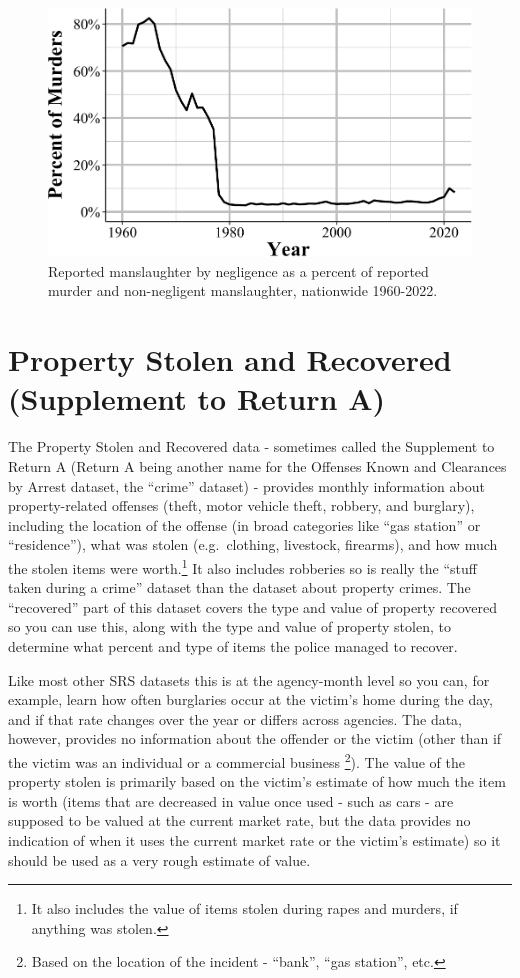 \documentclass[
  12pt,
  openany]{book}
\begin{document}
\begin{figure}

{\centering \includegraphics[width=0.9\linewidth]{03_offenses_known_files/figure-latex/manslaughterPercent-1} 

}

\caption{Reported manslaughter by negligence as a percent of reported murder and non-negligent manslaughter, nationwide 1960-2022.}\label{fig:manslaughterPercent}
\end{figure}

\chapter{Property Stolen and Recovered (Supplement to Return A)}\label{stolen_property}

The Property Stolen and Recovered data - sometimes called the Supplement to Return A (Return A being another name for the Offenses Known and Clearances by Arrest dataset, the ``crime'' dataset) - provides monthly information about property-related offenses (theft, motor vehicle theft, robbery, and burglary), including the location of the offense (in broad categories like ``gas station'' or ``residence''), what was stolen (e.g.~clothing, livestock, firearms), and how much the stolen items were worth.\footnote{It also includes the value of items stolen during rapes and murders, if anything was stolen.} It also includes robberies so is really the ``stuff taken during a crime'' dataset than the dataset about property crimes. The ``recovered'' part of this dataset covers the type and value of property recovered so you can use this, along with the type and value of property stolen, to determine what percent and type of items the police managed to recover.

Like most other SRS datasets this is at the agency-month level so you can, for example, learn how often burglaries occur at the victim's home during the day, and if that rate changes over the year or differs across agencies. The data, however, provides no information about the offender or the victim (other than if the victim was an individual or a commercial business \footnote{Based on the location of the incident - ``bank'', ``gas station'', etc.}). The value of the property stolen is primarily based on the victim's estimate of how much the item is worth (items that are decreased in value once used - such as cars - are supposed to be valued at the current market rate, but the data provides no indication of when it uses the current market rate or the victim's estimate) so it should be used as a very rough estimate of value.
\end{document}

